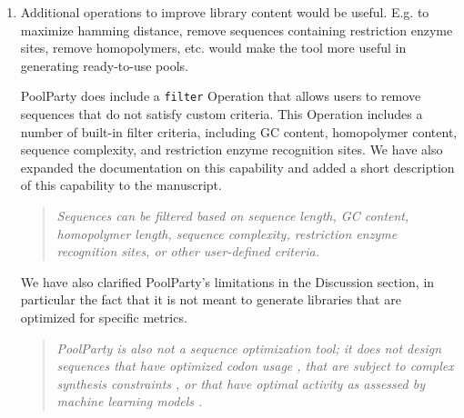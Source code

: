 \documentclass[11pt]{article}
\newenvironment{response}{\par\color{responseblue}}{\par}
\newenvironment{msquote}
  {\begin{quote}\color{responseblue}\itshape\noindent\ignorespaces}
  {\end{quote}}
\begin{document}
\begin{enumerate}
\begin{response}
Figs.~S3 and S4 in the new Supplemental Information document compare the code/files needed to create identical libraries with PoolParty and VaLiAnT (Fig.~S3) or tangermeme (Fig.~S4). We attempted to make a similar figure for MPRAnator, but that tool uses a web interface that is currently inoperative. 
\end{response}

\item Additional operations to improve library content would be useful. E.g. to maximize hamming distance, remove sequences containing restriction enzyme sites, remove homopolymers, etc. would make the tool more useful in generating ready-to-use pools.

\begin{response}
PoolParty does include a \texttt{filter} Operation that allows users to remove sequences that do not satisfy custom criteria. This Operation includes a number of built-in filter criteria, including GC content, homopolymer content, sequence complexity, and restriction enzyme recognition sites. We have also expanded the documentation on this capability and added a short description of this capability to the manuscript. 
\end{response}

\begin{msquote}
Sequences can be filtered based on sequence length, GC content, homopolymer
length, sequence complexity, restriction enzyme recognition sites, or other
user-defined criteria.
\end{msquote}

\begin{response}
We have also clarified PoolParty's limitations in the Discussion section, in particular the fact that it is not meant to generate libraries that are optimized for specific metrics.
\end{response}

\begin{msquote}
PoolParty is also not a sequence optimization tool; it does not design sequences that have optimized codon usage \citep{Swainston2017rb}, that are subject to complex synthesis constraints \citep{Zulkower2020jk}, or that have optimal activity as assessed by machine learning models \citep{Schreiber2025ledidi}.
\end{msquote}


\end{enumerate}
\end{document}
